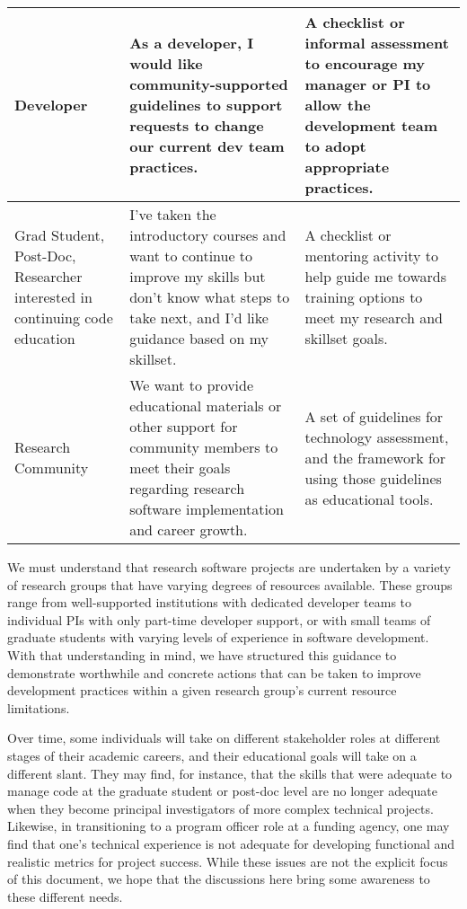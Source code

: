\documentclass{article}
\begin{document}
\begin{table}[!hbp]
\begin{tabularx}{\textwidth}{p{3cm}XX}
Developer & As a developer, I would like community-supported guidelines to support requests to change our current dev team practices. & A checklist or informal assessment to encourage my manager or PI to allow the development team to adopt appropriate practices. \\ \hline
Grad Student, Post-Doc, Researcher interested in continuing code education & I’ve taken the introductory courses and want to continue to improve my skills but don’t know what steps to take next, and I’d like guidance based on my skillset. & A checklist or mentoring activity to help guide me towards training options to meet my research and skillset goals. \\ \hline
Research Community & We want to provide educational materials or other support for community members to meet their goals regarding research software implementation and career growth. & A set of guidelines for technology assessment, and the framework for using those guidelines as educational tools. \\ \hline
\end{tabularx}
\label{table1}
\end{table} 

We must understand that research software projects are undertaken by a variety of research groups that have varying degrees of resources available. These groups range from well-supported institutions with dedicated developer teams to individual PIs with only part-time developer support, or with small teams of graduate students with varying levels of experience in software development. With that understanding in mind, we have structured this guidance to demonstrate worthwhile and concrete actions that can be taken to improve development practices within a given research group’s current resource limitations. 
 
Over time, some individuals will take on different stakeholder roles at different stages of their academic careers, and their educational goals will take on a different slant. They may find, for instance, that the skills that were adequate to manage code at the graduate student or post-doc level are no longer adequate when they become principal investigators of more complex technical projects. Likewise, in transitioning to a program officer role at a funding agency, one may find that one’s technical experience is not adequate for developing functional and realistic metrics for project success. While these issues are not the explicit focus of this document, we hope that the discussions here bring some awareness to these different needs.
 
\end{document}
